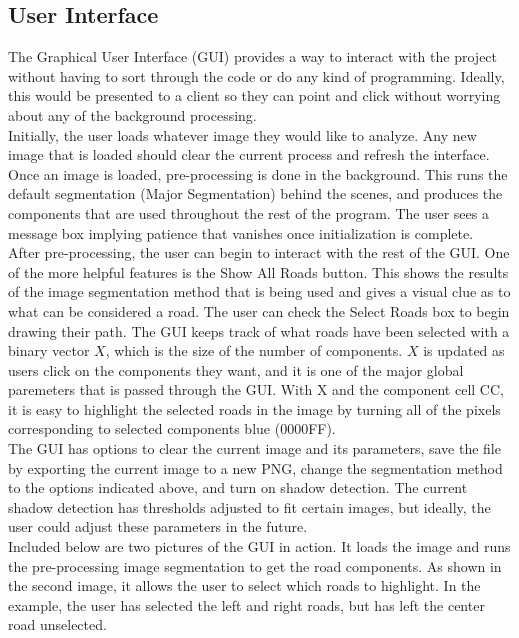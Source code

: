 \documentclass[12pt]{article}
\begin{document}
\subsection*{User Interface}
\indent The Graphical User Interface (GUI) provides a way to interact with the project without having to sort through the code or do any kind of programming. Ideally, this would be presented to a client so they can point and click without worrying about any of the background processing. 
\\
\indent Initially, the user loads whatever image they would like to analyze. Any new image that is loaded should clear the current process and refresh the interface. Once an image is loaded, pre-processing is done in the background. This runs the default segmentation (Major Segmentation) behind the scenes, and produces the components that are used throughout the rest of the program. The user sees a message box implying patience that vanishes once initialization is complete.
\\
\indent After pre-processing, the user can begin to interact with the rest of the GUI. One of the more helpful features is the Show All Roads button. This shows the results of the image segmentation method that is being used and gives a visual clue as to what can be considered a road. The user can check the Select Roads box to begin drawing their path. The GUI keeps track of what roads have been selected with a binary vector $X$, which is the size of the number of components. $X$ is updated as users click on the components they want, and it is one of the major global paremeters that is passed through the GUI. With X and the component cell CC, it is easy to highlight the selected roads in the image by turning all of the pixels corresponding to selected components blue (0000FF).
\\
\indent The GUI has options to clear the current image and its parameters, save the file by exporting the current image to a new PNG, change the segmentation method to the options indicated above, and turn on shadow detection. The current shadow detection has thresholds adjusted to fit certain images, but ideally, the user could adjust these parameters in the future. \\
Included below are two pictures of the GUI in action. It loads the image and runs the pre-processing image segmentation to get the road components. As shown in the second image, it allows the user to select which roads to highlight. In the example, the user has selected the left and right roads, but has left the center road unselected. 
\end{document}
